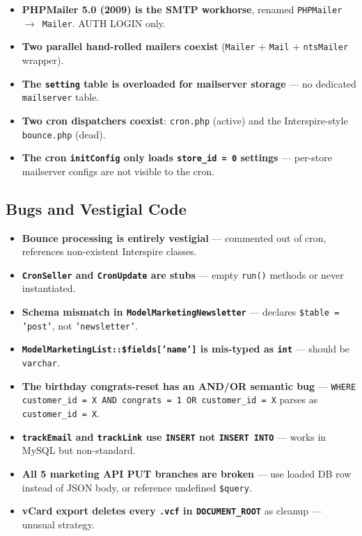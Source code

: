 \documentclass[11pt,a4paper]{article}
\begin{document}
\begin{itemize}[leftmargin=1.6em,itemsep=2pt]
  \item \textbf{PHPMailer 5.0 (2009) is the SMTP workhorse},
        renamed \texttt{PHPMailer $\to$ Mailer}. AUTH LOGIN only.
  \item \textbf{Two parallel hand-rolled mailers coexist}
        (\texttt{Mailer} + \texttt{Mail} + \texttt{ntsMailer}
        wrapper).
  \item \textbf{The \texttt{setting} table is overloaded for
        mailserver storage} --- no dedicated \texttt{mailserver}
        table.
  \item \textbf{Two cron dispatchers coexist}: \texttt{cron.php}
        (active) and the Interspire-style \texttt{bounce.php}
        (dead).
  \item \textbf{The cron \texttt{initConfig} only loads
        \texttt{store\_id = 0} settings} --- per-store mailserver
        configs are not visible to the cron.
\end{itemize}

\subsection{Bugs and Vestigial Code}

\begin{itemize}[leftmargin=1.6em,itemsep=2pt]
  \item \textbf{Bounce processing is entirely vestigial} ---
        commented out of cron, references non-existent Interspire
        classes.
  \item \textbf{\texttt{CronSeller} and \texttt{CronUpdate} are
        stubs} --- empty \texttt{run()} methods or never
        instantiated.
  \item \textbf{Schema mismatch in \texttt{ModelMarketingNewsletter}}
        --- declares \texttt{\$table = 'post'}, not
        \texttt{'newsletter'}.
  \item \textbf{\texttt{ModelMarketingList::\$fields['name']} is
        mis-typed as \texttt{int}} --- should be
        \texttt{varchar}.
  \item \textbf{The birthday congrats-reset has an AND/OR
        semantic bug} --- \texttt{WHERE customer\_id = X AND
        congrats = 1 OR customer\_id = X} parses as
        \texttt{customer\_id = X}.
  \item \textbf{\texttt{trackEmail} and \texttt{trackLink} use
        \texttt{INSERT} not \texttt{INSERT INTO}} --- works in
        MySQL but non-standard.
  \item \textbf{All 5 marketing API PUT branches are broken} ---
        use loaded DB row instead of JSON body, or reference
        undefined \texttt{\$query}.
  \item \textbf{vCard export deletes every \texttt{.vcf} in
        \texttt{DOCUMENT\_ROOT}} as cleanup --- unusual strategy.
\end{itemize}
\end{document}
